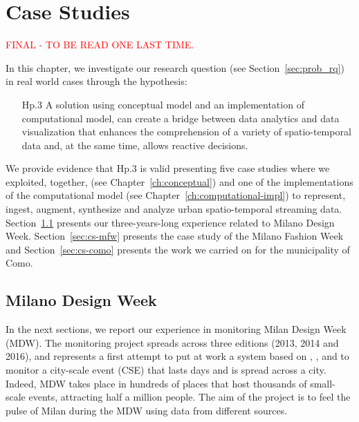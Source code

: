 \chapter{Case Studies}\label{ch:case-studies}

\textcolor{red}{FINAL - TO BE READ ONE LAST TIME.}

In this chapter, we investigate our research question (see Section~\ref{sec:prob_rq}) in real world cases through the hypothesis:
\begin{itemize}[leftmargin=42pt]
\item[\textsf{Hp.3}] A solution using \frappe{} conceptual model and an implementation of \river{} computational model, can create a bridge between data analytics and data visualization that enhances the comprehension of a variety of spatio-temporal data and, at the same time, allows reactive decisions.
\end{itemize}

We provide evidence that \textsf{Hp.3} is valid presenting five case studies where we exploited, together, \frappe{} (see Chapter~\ref{ch:conceptual}) and one of the implementations of the \river{} computational model (see Chapter~\ref{ch:computational-impl}) to represent, ingest, augment, synthesize and analyze urban spatio-temporal streaming data.
Section~\ref{sec:cs-mdw} presents our three-years-long experience related to Milano Design Week. Section~\ref{sec:cs-mfw} presents the case study of the Milano Fashion Week and Section~\ref{sec:cs-como} presents the work we carried on for the municipality of Como.

\section{Milano Design Week} \label{sec:cs-mdw}
In the next sections, we report our experience in monitoring Milan Design Week (MDW).
The monitoring project spreads across three editions (2013, 2014 and 2016), and represents a first attempt to put at work a system based on \frappe{}, \sti{}, \hivedi{} and \sparkdi{} to monitor a city-scale event (CSE) that lasts days and is spread across a city.
Indeed, MDW takes place in hundreds of places that host thousands of small-scale events, attracting half a million people.
The aim of the project is to feel the pulse of Milan during the MDW using data from different sources.

